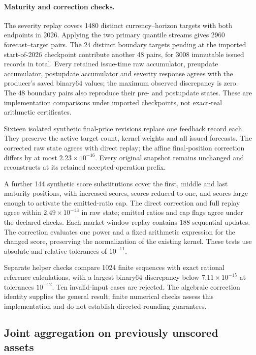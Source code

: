 \documentclass[11pt,a4paper]{article}
\theoremstyle{definition}\newtheorem{definition}[theorem]{Definition}
\begin{document}
\paragraph{Maturity and correction checks.}
The severity replay covers 1480 distinct currency--horizon targets with both endpoints in 2026. Applying the two primary quantile streams gives 2960 forecast--target pairs. The 24 distinct boundary targets pending at the imported start-of-2026 checkpoint contribute another 48 pairs, for 3008 immutable issued records in total. Every retained issue-time raw accumulator, preupdate accumulator, postupdate accumulator and severity response agrees with the producer's saved binary64 values; the maximum observed discrepancy is zero. The 48 boundary pairs also reproduce their pre- and postupdate states. These are implementation comparisons under imported checkpoints, not exact-real arithmetic certificates.

Sixteen isolated synthetic final-price revisions replace one feedback record each. They preserve the active target count, kernel weights and all issued forecasts. The corrected raw state agrees with direct replay; the affine final-position correction differs by at most $2.23\times10^{-16}$. Every original snapshot remains unchanged and reconstructs at its retained accepted-operation prefix.

A further 144 synthetic score substitutions cover the first, middle and last maturity positions, with increased scores, scores reduced to one, and scores large enough to activate the emitted-ratio cap. The direct correction and full replay agree within $2.49\times10^{-13}$ in raw state; emitted ratios and cap flags agree under the declared checks. Each market-window replay contains 188 sequential updates. The correction evaluates one power and a fixed arithmetic expression for the changed score, preserving the normalization of the existing kernel. These tests use absolute and relative tolerances of $10^{-11}$.

Separate helper checks compare 1024 finite sequences with exact rational reference calculations, with a largest binary64 discrepancy below $7.11\times10^{-15}$ at tolerances $10^{-12}$. Ten invalid-input cases are rejected. The algebraic correction identity supplies the general result; finite numerical checks assess this implementation and do not establish directed-rounding guarantees.



\subsection{Joint aggregation on previously unscored assets}\label{sec:aggregateresults}
\end{document}

